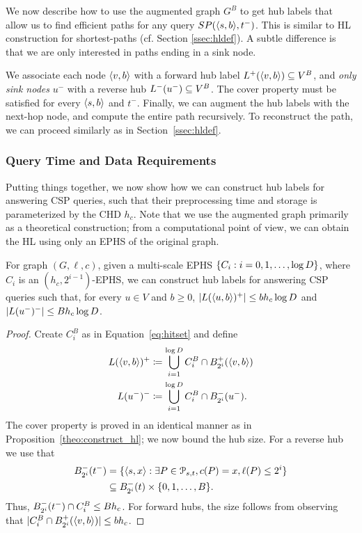 We now describe how to use the augmented graph $G^B$ to get hub labels that allow us to find efficient paths for any query $SP(\pp{s,b},t^-)$.
This is similar to HL construction for shortest-paths (cf. Section \ref{ssec:hldef}).
A subtle difference is that we are only interested in paths ending in a sink node.

We associate each node $\pp{v,b}$ with a forward hub label $\Lf(\pp{v,b})\subseteq V^B$, and \emph{only sink nodes} $u^-$ with a reverse hub $\Lb(u^-)\subseteq V^B$.
The cover property must be satisfied for every $\pp{s,b}$ and $t^-$.
Finally, we can augment the hub labels with the next-hop node, and compute the entire path recursively.
To reconstruct the path, we can proceed similarly as in Section~\ref{ssec:hldef}.

\subsubsection{Query Time and Data Requirements}
Putting things together, we now show how we can construct hub labels for answering CSP queries, such that their preprocessing time and storage is parameterized by the CHD $h_c$.
Note that we use the augmented graph primarily as a theoretical construction; from a computational point of view, we can obtain the HL using only an EPHS of the original graph.

\begin{theorem}
\label{theo:HLeff}
For graph $(G,\ell,c)$, given a multi-scale EPHS $\crl*{C_i:i=0,1,\ldots,\log D}$, where $C_i$ is an $(h_c,2^{i-1})$-EPHS, we can construct hub labels for answering CSP queries such that, for every $u\in V$ and $b\geq 0$, $\card{L(\pp{u,b})^+}\leq bh_c\log D$ and $\card{L(u^-)^-}\leq Bh_c\log D$. 
\end{theorem}
\begin{proof}
Create $C_i^B$ as in Equation~\eqref{eq:hitset} and define
\begin{align*}
L(\pp{v,b})^+ &\defeq \bigcup_{i=1}^{\log D} C_i^B\cap \Bf_{2^i}(\pp{v,b})\\
L(u^-)^-  &\defeq \bigcup_{i=1}^{\log D} C_i^B\cap \Bb_{2^i}(u^-).
\end{align*}
The cover property is proved in an identical manner as in Proposition~\ref{theo:construct_hl}; we now bound the hub size.
For a reverse hub we use that
\begin{align*}
\Bb_{2^i}(t^-) &= \{\pp{s,x}: \exists P\in \Pst, c(P)=x, \ell(P)\leq 2^i\}\\
&\subseteq \Bb_{2^i}(t)\times \{0,1,\ldots,B\}.
\end{align*}
Thus, $\Bb_{2^i}(t^-)\cap C_i^B\leq Bh_c$.
For forward hubs, the size follows from observing that $ \card{C_i^B\cap \Bf_{2^i}(\pp{v,b})}\leq bh_c$.
\end{proof}

